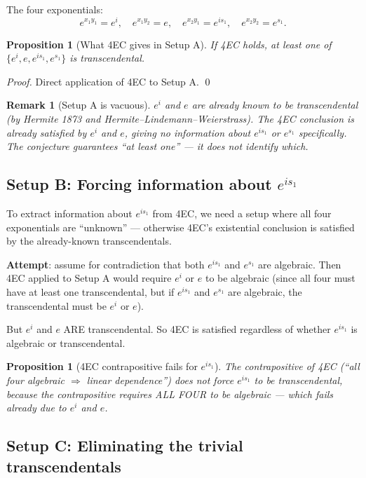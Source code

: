 \documentclass[11pt]{article}
\newtheorem{proposition}[theorem]{Proposition}
\newtheorem{remark}[theorem]{Remark}
\begin{document}
The four exponentials:
\[
e^{x_1 y_1} = e^i,\quad e^{x_1 y_2} = e,\quad e^{x_2 y_1} = e^{is_1},\quad e^{x_2 y_2} = e^{s_1}.
\]

\begin{proposition}[What 4EC gives in Setup A]
If 4EC holds, at least one of $\{e^i, e, e^{is_1}, e^{s_1}\}$ is transcendental.
\end{proposition}

\begin{proof}
Direct application of 4EC to Setup A. \qed
\end{proof}

\begin{remark}[Setup A is vacuous]
$e^i$ and $e$ are already known to be transcendental (by Hermite 1873 and
Hermite--Lindemann--Weierstrass). The 4EC conclusion is \emph{already satisfied}
by $e^i$ and $e$, giving no information about $e^{is_1}$ or $e^{s_1}$ specifically.
The conjecture guarantees ``at least one'' — it does not identify which.
\end{remark}

\subsection{Setup B: Forcing information about $e^{is_1}$}

To extract information about $e^{is_1}$ from 4EC, we need a setup where
all four exponentials are ``unknown'' — otherwise 4EC's existential conclusion
is satisfied by the already-known transcendentals.

\textbf{Attempt}: assume for contradiction that both $e^{is_1}$ and $e^{s_1}$ are
algebraic. Then 4EC applied to Setup A would require $e^i$ or $e$ to be algebraic
(since all four must have at least one transcendental, but if $e^{is_1}$ and $e^{s_1}$
are algebraic, the transcendental must be $e^i$ or $e$).

But $e^i$ and $e$ ARE transcendental. So 4EC is satisfied regardless of whether
$e^{is_1}$ is algebraic or transcendental.

\begin{proposition}[4EC contrapositive fails for $e^{is_1}$]
The contrapositive of 4EC (``all four algebraic $\Rightarrow$ linear dependence'')
does not force $e^{is_1}$ to be transcendental, because the contrapositive
requires ALL FOUR to be algebraic — which fails already due to $e^i$ and $e$.
\end{proposition}

\subsection{Setup C: Eliminating the trivial transcendentals}
\end{document}
